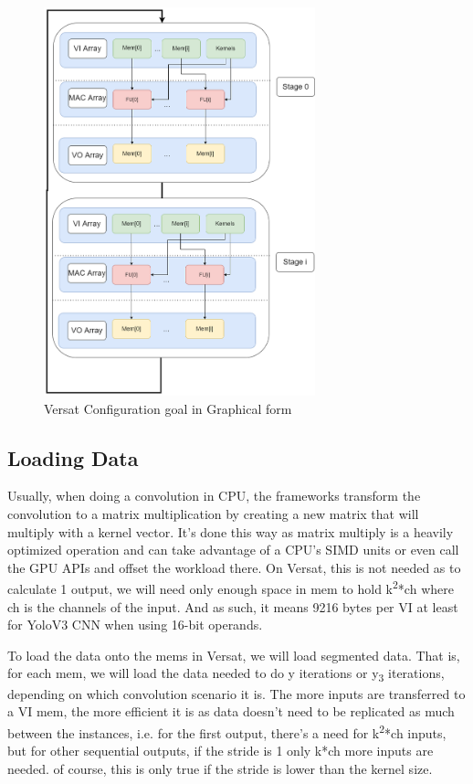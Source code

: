 \begin{figure}[!htbp]
    \centering
    \includegraphics[width=0.7\textwidth]{Figures/Convolution.drawio.png}
    \caption{Versat Configuration goal in Graphical form}
    \label{VersatConfiguration}
\end{figure}

\subsection{Loading Data}

Usually, when doing a convolution in CPU, the frameworks transform the convolution to a matrix multiplication by creating a new matrix that will multiply with a
kernel vector. It's done this way as matrix multiply is a heavily optimized operation and can take advantage of a CPU's SIMD units or even call the GPU APIs
and offset the workload there. On Versat, this is not needed as to calculate 1 output, we will need only enough space in mem to hold
k\textsuperscript{2}*ch where ch is the channels of the input. And as such, it means 9216 bytes per VI at least for YoloV3 CNN when using 16-bit operands.

To load the data onto the mems in Versat, we will load segmented data. That is, for each mem, we will load the data
needed to do y iterations or y\textsubscript{3} iterations, depending on which convolution scenario it is.
The more inputs are transferred to a VI mem, the more efficient it is as data doesn't need to be replicated as much between the instances,
i.e. for the first output, there's a need for k\textsuperscript{2}*ch inputs, but for other sequential outputs, if the stride is 1 only k*ch more inputs are needed.
of course, this is only true if the stride is lower than the kernel size.

